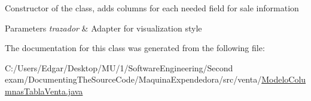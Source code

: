 Constructor of the class, adds columns for each needed field for sale information 
\begin{DoxyParams}{Parameters}
{\em trazador} & Adapter for visualization style \\
\hline
\end{DoxyParams}


The documentation for this class was generated from the following file\+:\begin{DoxyCompactItemize}
\item 
C\+:/\+Users/\+Edgar/\+Desktop/\+M\+U/1/\+Software\+Engineering/\+Second exam/\+Documenting\+The\+Source\+Code/\+Maquina\+Expendedora/src/venta/\mbox{\hyperlink{_modelo_columnas_tabla_venta_8java}{Modelo\+Columnas\+Tabla\+Venta.\+java}}\end{DoxyCompactItemize}
